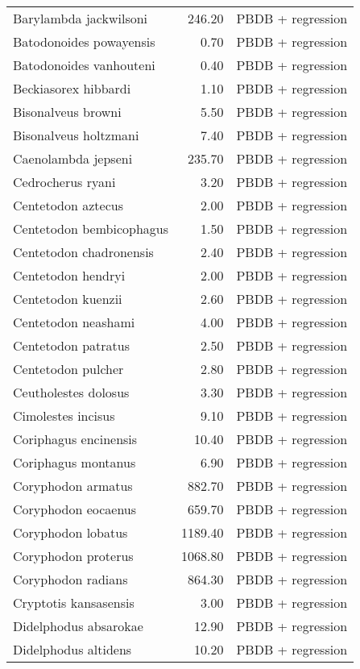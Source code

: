 \begin{table}[ht]
\begin{tabular}{lrl}
  Barylambda jackwilsoni & 246.20 & PBDB + regression \\ 
  Batodonoides powayensis & 0.70 & PBDB + regression \\ 
  Batodonoides vanhouteni & 0.40 & PBDB + regression \\ 
  Beckiasorex hibbardi & 1.10 & PBDB + regression \\ 
  Bisonalveus browni & 5.50 & PBDB + regression \\ 
  Bisonalveus holtzmani & 7.40 & PBDB + regression \\ 
  Caenolambda jepseni & 235.70 & PBDB + regression \\ 
  Cedrocherus ryani & 3.20 & PBDB + regression \\ 
  Centetodon aztecus & 2.00 & PBDB + regression \\ 
  Centetodon bembicophagus & 1.50 & PBDB + regression \\ 
  Centetodon chadronensis & 2.40 & PBDB + regression \\ 
  Centetodon hendryi & 2.00 & PBDB + regression \\ 
  Centetodon kuenzii & 2.60 & PBDB + regression \\ 
  Centetodon neashami & 4.00 & PBDB + regression \\ 
  Centetodon patratus & 2.50 & PBDB + regression \\ 
  Centetodon pulcher & 2.80 & PBDB + regression \\ 
  Ceutholestes dolosus & 3.30 & PBDB + regression \\ 
  Cimolestes incisus & 9.10 & PBDB + regression \\ 
  Coriphagus encinensis & 10.40 & PBDB + regression \\ 
  Coriphagus montanus & 6.90 & PBDB + regression \\ 
  Coryphodon armatus & 882.70 & PBDB + regression \\ 
  Coryphodon eocaenus & 659.70 & PBDB + regression \\ 
  Coryphodon lobatus & 1189.40 & PBDB + regression \\ 
  Coryphodon proterus & 1068.80 & PBDB + regression \\ 
  Coryphodon radians & 864.30 & PBDB + regression \\ 
  Cryptotis kansasensis & 3.00 & PBDB + regression \\ 
  Didelphodus absarokae & 12.90 & PBDB + regression \\ 
  Didelphodus altidens & 10.20 & PBDB + regression \\ 

\end{tabular}
\end{table}
